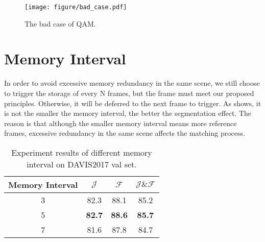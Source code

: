 \documentclass[runningheads]{llncs}
\begin{document}
    \begin{figure}[t]
      \centering
      \texttt{[image: figure/bad\_case.pdf]}
      \caption{The bad case of QAM.}
      \label{bad_case}
    \end{figure}
    
\section{Memory Interval}
    In order to avoid excessive memory redundancy in the same scene, 
    we still choose to trigger the storage of every N frames, but the frame must meet our proposed principles. 
    Otherwise, it will be deferred to the next frame to trigger. 
    As  shows, it is not the smaller the memory interval, the better the segmentation effect. 
The reason is that although the smaller memory interval means more reference frames, excessive redundancy in the same scene affects the matching process.
    \begin{table}[h]
\renewcommand\tabcolsep{5pt}
    \footnotesize
    \centering
    \caption{Experiment results of different memory interval on DAVIS2017 val set.}
    \label{memory interval}
\begin{tabular}{cccc}
    \toprule[1.5pt]
    Memory Interval & $\mathcal{J}$ &$\mathcal{F}$ & $\mathcal{J}\&\mathcal{F}$ \\ \midrule
    3               & 82.3 & 88.1 & 85.2 \\
    5               & \textbf{82.7} & \textbf{88.6} & \textbf{85.7} \\
    7               & 81.6 & 87.8 & 84.7 \\ \bottomrule[1.5pt]
    \end{tabular}
    \end{table}
    
    
%
  
\end{document}
